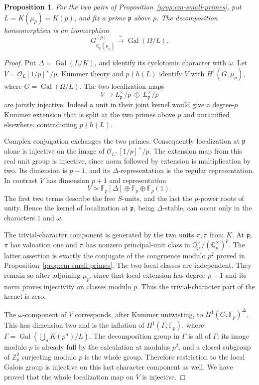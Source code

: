 \documentclass[11pt]{article}
\newtheorem{proposition}[theorem]{Proposition}
\theoremstyle{definition}\newtheorem{definition}[theorem]{Definition}
\begin{document}
\begin{proposition}\label{prop:cm-locality}
For the two pairs of Proposition~\ref{prop:cm-small-primes},
put \(L=K(\mu_p)=K(p)\), and fix a prime \(\mathfrak p\) above \(p\).
The decomposition homomorphism is an isomorphism
\[
 G_{\mathbb Q_p(\mu_p)}^{(p)}
    \xrightarrow{\ \sim\ }\operatorname{Gal}(\Omega/L).
\]
\end{proposition}
\begin{proof}
Put \(\Delta=\operatorname{Gal}(L/K)\), and identify its
cyclotomic character with \(\omega\). Let
\(V=\mathcal O_L[1/p]^\times/p\). Kummer theory and
\(p\nmid h(L)\) identify \(V\) with \(H^1(G,\mu_p)\),
where \(G=\operatorname{Gal}(\Omega/L)\).
The two localization maps
\[
 V\longrightarrow
 L_{\mathfrak p}^{\times}/p\ \oplus\
 L_{\bar{\mathfrak p}}^{\times}/p
\]
are jointly injective. Indeed a unit in their joint
kernel would give a degree-\(p\) Kummer extension that
is split at the two primes above \(p\) and unramified
elsewhere, contradicting \(p\nmid h(L)\).

Complex conjugation exchanges the two primes.
Consequently localization at \(\mathfrak p\) alone is
injective on the image of
\(\mathcal O_{L^+}[1/p]^\times/p\).
The extension map from this real unit group is injective,
since norm followed by extension is multiplication by two.
Its dimension is \(p-1\), and its \(\Delta\)-representation
is the regular representation. In contrast \(V\) has
dimension \(p+1\) and representation
\[
 V\simeq\mathbb F_p[\Delta]\oplus\mathbb F_p
                      \oplus\mathbb F_p(1).
\]
The first two terms describe the free \(S\)-units, and the
last the \(p\)-power roots of unity. Hence the kernel of
localization at \(\mathfrak p\), being \(\Delta\)-stable,
can occur only in the characters \(1\) and \(\omega\).

The trivial-character component is generated by the
two units \(\pi,\bar\pi\) from \(K\). At \(\mathfrak p\),
\(\pi\) has valuation one and \(\bar\pi\) has nonzero
principal-unit class in \(\mathbb Q_p^\times/
(\mathbb Q_p^\times)^p\). The latter assertion is exactly
the conjugate of the congruence modulo \(p^2\) proved in
Proposition~\ref{prop:cm-small-primes}. The two local
classes are independent. They remain so after adjoining
\(\mu_p\), since that local extension has degree \(p-1\)
and its norm proves injectivity on classes modulo \(p\).
Thus the trivial-character part of the kernel is zero.

The \(\omega\)-component of \(V\) corresponds, after
Kummer untwisting, to \(H^1(G,\mathbb F_p)^\Delta\).
This has dimension two and is the inflation of
\(H^1(\Gamma,\mathbb F_p)\), where
\(\Gamma=\operatorname{Gal}(\bigcup_nK(p^n)/L)\).
The decomposition group in \(\Gamma\) is all of \(\Gamma\):
its image modulo \(p\) is already full by the calculation
at modulus \(p^2\), and a closed subgroup of \(\mathbb Z_p^2\)
surjecting modulo \(p\) is the whole group. Therefore
restriction to the local Galois group is injective on
this last character component as well.
We have proved that the whole localization map on \(V\)
is injective.


\end{proof}
\end{document}
